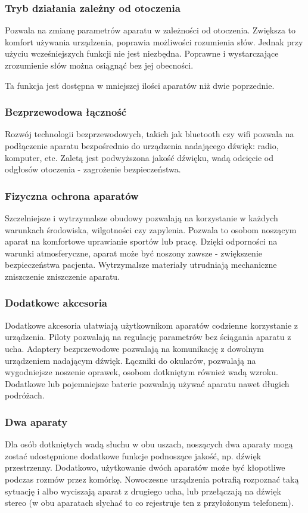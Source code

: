 \documentclass{beamer}
\begin{document}
\begin{frame}
\frametitle{Tryb działania zależny od otoczenia}
Pozwala na zmianę parametrów aparatu w zależności od otoczenia. Zwiększa to komfort używania urządzenia, poprawia możliwości rozumienia słów. Jednak przy użyciu wcześniejszych funkcji nie jest niezbędna. Poprawne i wystarczające zrozumienie słów można osiągnąć bez jej obecności.

Ta funkcja jest dostępna w mniejszej ilości aparatów niż dwie poprzednie.
\end{frame}

\begin{frame}
  \frametitle{Bezprzewodowa łączność}

  Rozwój technologii bezprzewodowych, takich jak bluetooth czy wifi pozwala na
  podłączenie aparatu bezpośrednio do urządzenia nadającego dźwięk: radio,
  komputer, etc. Zaletą jest podwyższona jakość dźwięku, wadą odcięcie od
  odgłosów otoczenia - zagrożenie bezpieczeństwa.
\end{frame}


\begin{frame}
  \frametitle{Fizyczna ochrona aparatów}

  Szczelniejsze i wytrzymalsze obudowy pozwalają na korzystanie w każdych
  warunkach środowiska, wilgotności czy zapylenia. Pozwala to osobom noszącym
  aparat na komfortowe uprawianie sportów lub pracę. Dzięki odporności na
  warunki atmosferyczne, aparat może być noszony zawsze - zwiększenie
  bezpieczeństwa pacjenta. Wytrzymalsze materiały utrudniają mechaniczne
  zniszczenie zniszczenie aparatu.
\end{frame}


\begin{frame}
  \frametitle{Dodatkowe akcesoria}

  Dodatkowe akcesoria ułatwiają użytkownikom aparatów codzienne korzystanie z
  urządzenia. Piloty pozwalają na regulację parametrów bez ściągania aparatu z
  ucha. Adaptery bezprzewodowe pozwalają na komunikację z dowolnym urządzeniem
  nadającym dźwięk. Łączniki do okularów, pozwalają na wygodniejsze noszenie
  oprawek, osobom dotkniętym również wadą wzroku. Dodatkowe lub pojemniejsze
  baterie pozwalają używać aparatu nawet długich podróżach.
\end{frame}


\begin{frame}
  \frametitle{Dwa aparaty}

  Dla osób dotkniętych wadą słuchu w obu uszach, noszących dwa aparaty mogą
  zostać udostępnione dodatkowe funkcje podnoszące jakość, np.
  dźwięk przestrzenny. Dodatkowo, użytkowanie
  dwóch aparatów może być kłopotliwe podczas rozmów przez komórkę. Nowoczesne
  urządzenia potrafią rozpoznać taką sytuację i albo wyciszają aparat z
  drugiego ucha, lub przełączają na dźwięk stereo (w obu aparatach słychać to
  co rejestruje ten z przyłożonym telefonem).
\end{frame}
\end{document}
